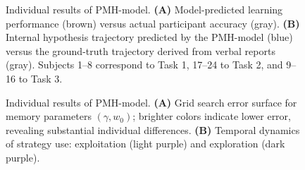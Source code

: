 

\newpage
\begin{figure}[htbp]
    \centering
    \vspace{1em}

    \caption{Individual results of PMH-model. \textbf{(A)} Model-predicted learning performance (brown) versus actual participant accuracy (gray). \textbf{(B)} Internal hypothesis trajectory predicted by the PMH-model (blue) versus the ground-truth trajectory derived from verbal reports (gray). Subjects 1–8 correspond to Task 1, 17–24 to Task 2, and 9–16 to Task 3.}
    \label{fig:S4}
\end{figure}


\newpage
\begin{figure}[htbp]
    \centering
    \vspace{0.7em}

    \caption{Individual results of PMH-model. \textbf{(A)} Grid search error surface for memory parameters $(\gamma, w_0)$; brighter colors indicate lower error, revealing substantial individual differences. \textbf{(B)} Temporal dynamics of strategy use: exploitation (light purple) and exploration (dark purple).}
    \label{fig:S5}
\end{figure}


